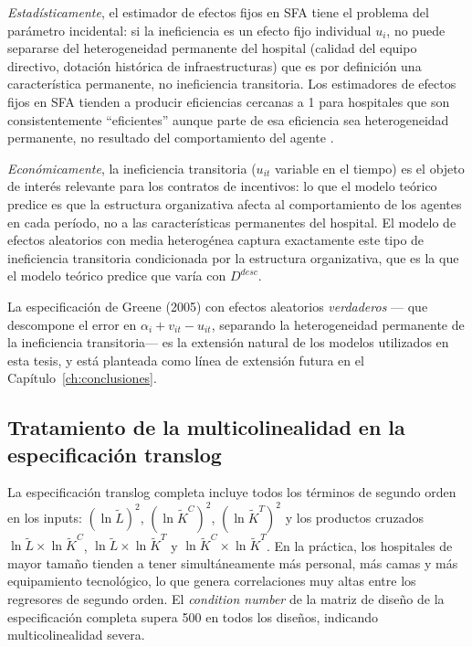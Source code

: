 \documentclass[12pt, a4paper, twoside, openright]{book}
\theoremstyle{plain}
\theoremstyle{definition}
\theoremstyle{remark}
\begin{document}
\textit{Estadísticamente}, el estimador de efectos fijos en SFA tiene el problema del parámetro incidental: si la ineficiencia es un efecto fijo individual $u_i$, no puede separarse del heterogeneidad permanente del hospital (calidad del equipo directivo, dotación histórica de infraestructuras) que es por definición una característica permanente, no ineficiencia transitoria. Los estimadores de efectos fijos en SFA tienden a producir eficiencias cercanas a 1 para hospitales que son consistentemente ``eficientes'' aunque parte de esa eficiencia sea heterogeneidad permanente, no resultado del comportamiento del agente \citep{greene2005a}.

\textit{Económicamente}, la ineficiencia transitoria ($u_{it}$ variable en el tiempo) es el objeto de interés relevante para los contratos de incentivos: lo que el modelo teórico predice es que la estructura organizativa afecta al comportamiento de los agentes en cada período, no a las características permanentes del hospital. El modelo de efectos aleatorios con media heterogénea \citep{battese1995,wang2002} captura exactamente este tipo de ineficiencia transitoria condicionada por la estructura organizativa, que es la que el modelo teórico predice que varía con $D^{desc}$.

La especificación de Greene (2005) con efectos aleatorios \textit{verdaderos} --- que descompone el error en $\alpha_i + v_{it} - u_{it}$, separando la heterogeneidad permanente de la ineficiencia transitoria--- es la extensión natural de los modelos utilizados en esta tesis, y está planteada como línea de extensión futura en el Capítulo~\ref{ch:conclusiones}.

\subsection{Tratamiento de la multicolinealidad en la especificación translog}

La especificación translog completa incluye todos los términos de segundo orden en los inputs: $(\ln\tilde{L})^2$, $(\ln\tilde{K}^C)^2$, $(\ln\tilde{K}^T)^2$ y los productos cruzados $\ln\tilde{L}\times\ln\tilde{K}^C$, $\ln\tilde{L}\times\ln\tilde{K}^T$ y $\ln\tilde{K}^C\times\ln\tilde{K}^T$. En la práctica, los hospitales de mayor tamaño tienden a tener simultáneamente más personal, más camas y más equipamiento tecnológico, lo que genera correlaciones muy altas entre los regresores de segundo orden. El \textit{condition number} de la matriz de diseño de la especificación completa supera 500 en todos los diseños, indicando multicolinealidad severa.
\end{document}
